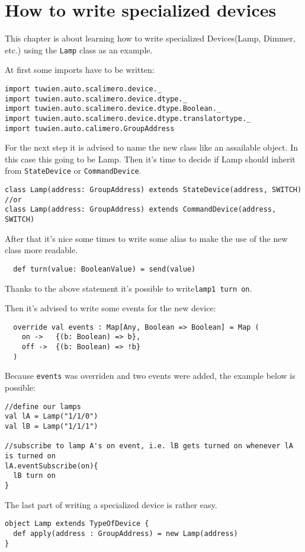 \chapter{How to write specialized devices}
This chapter is about learning how to write specialized Devices(Lamp, Dimmer, etc.) using the \lstinline!Lamp! class as an example.

At first some imports have to be written:
\begin{lstlisting}
import tuwien.auto.scalimero.device._
import tuwien.auto.scalimero.device.dtype._
import tuwien.auto.scalimero.device.dtype.Boolean._
import tuwien.auto.scalimero.device.dtype.translatortype._
import tuwien.auto.calimero.GroupAddress
\end{lstlisting}
For the next step it is advised to name the new class like an assailable object. In this case this going to be Lamp. Then it's time to decide if Lamp should inherit from \lstinline!StateDevice! or \lstinline!CommandDevice!.
\begin{lstlisting}
class Lamp(address: GroupAddress) extends StateDevice(address, SWITCH)
//or
class Lamp(address: GroupAddress) extends CommandDevice(address, SWITCH)
\end{lstlisting}
After that it's nice some times to write some alias to make the use of the new class more readable.
\begin{lstlisting}
  def turn(value: BooleanValue) = send(value)
\end{lstlisting}
 Thanks to the above statement it's possible to write\lstinline!lamp1 turn on!.
 
 Then it's advised to write some events for the new device:
\begin{lstlisting}
  override val events : Map[Any, Boolean => Boolean] = Map (
    on ->   {(b: Boolean) => b},
    off ->  {(b: Boolean) => !b}
  )
\end{lstlisting}
Because \lstinline!events! was overriden and two events were added, the example below is possible:
\begin{lstlisting}
//define our lamps
val lA = Lamp("1/1/0")
val lB = Lamp("1/1/1")

//subscribe to lamp A's on event, i.e. lB gets turned on whenever lA is turned on
lA.eventSubscribe(on){
  lB turn on
}
\end{lstlisting}

The last part of writing a specialized device is rather easy. \begin{lstlisting}
object Lamp extends TypeOfDevice {
  def apply(address : GroupAddress) = new Lamp(address)
}
\end{lstlisting}